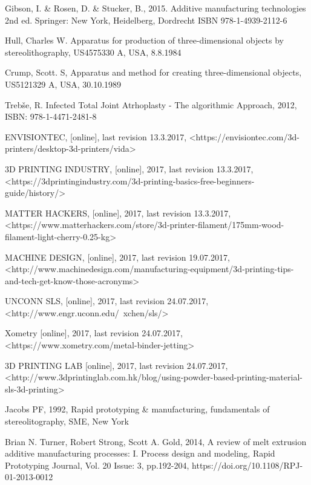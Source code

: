 \documentclass[a4paper, twoside, 11pt]{report}
\begin{document}
\begin{thebibliography}{99}
	Gibson, I. \& Rosen, D. \& Stucker, B.,
	2015.
	Additive manufacturing technologies
	2nd ed.
	Springer:
	New York, Heidelberg, Dordrecht
	ISBN 978-1-4939-2112-6
	
	Hull, Charles W.
	Apparatus for production of three-dimensional objects by stereolithography,
	US4575330 A,
	USA,
	8.8.1984
	
	Crump, Scott. S,
	Apparatus and method for creating three-dimensional objects,
	US5121329 A,
	USA,
	30.10.1989
	
	
	Trebše, R.
	Infected Total Joint Atrhoplasty - The algorithmic Approach,
	2012,
	ISBN: 978-1-4471-2481-8
	
	ENVISIONTEC,
	[online],
	last revision 13.3.2017,
	<https://envisiontec.com/3d-printers/desktop-3d-printers/vida>
	
	3D PRINTING INDUSTRY,
	[online],
	2017,
	last revision 13.3.2017,
	<https://3dprintingindustry.com/3d-printing-basics-free-beginners-guide/history/>
	
	MATTER HACKERS,
	[online],
	2017,
	last revision 13.3.2017,
	<https://www.matterhackers.com/store/3d-printer-filament/175mm-wood-filament-light-cherry-0.25-kg>
	
	MACHINE DESIGN,
	[online],
	2017,
	last revision 19.07.2017,
	<http://www.machinedesign.com/manufacturing-equipment/3d-printing-tips-and-tech-get-know-those-acronyms>
	
	UNCONN SLS,
	[online],
	2017,
	last revision 24.07.2017,
	<http://www.engr.uconn.edu/~xchen/sls/>
	
	Xometry
	[online],
	2017,
	last revision 24.07.2017,
	<https://www.xometry.com/metal-binder-jetting>
	
	3D PRINTING LAB
	[online],
	2017,
	last revision 24.07.2017,
	<http://www.3dprintinglab.com.hk/blog/using-powder-based-printing-material-sls-3d-printing>
	
	Jacobs PF,
	1992,
	Rapid prototyping \& manufacturing,
	fundamentals of stereolitography,
	SME,
	New York
	
	Brian N. Turner, Robert Strong, Scott A. Gold,
	2014,
	A review of melt extrusion additive manufacturing processes: I. Process design and modeling,
	Rapid Prototyping Journal, Vol. 20 Issue: 3, pp.192-204,
	https://doi.org/10.1108/RPJ-01-2013-0012
	

\end{thebibliography}
\end{document}
